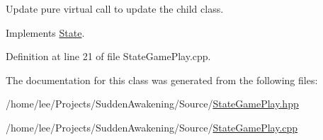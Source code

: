 Update pure virtual call to update the child class. 



Implements \hyperlink{class_state_a43d4ca30d927c023316c058b700c0716}{State}.



Definition at line 21 of file State\-Game\-Play.\-cpp.



The documentation for this class was generated from the following files\-:\begin{DoxyCompactItemize}
\item 
/home/lee/\-Projects/\-Sudden\-Awakening/\-Source/\hyperlink{_state_game_play_8hpp}{State\-Game\-Play.\-hpp}\item 
/home/lee/\-Projects/\-Sudden\-Awakening/\-Source/\hyperlink{_state_game_play_8cpp}{State\-Game\-Play.\-cpp}\end{DoxyCompactItemize}
